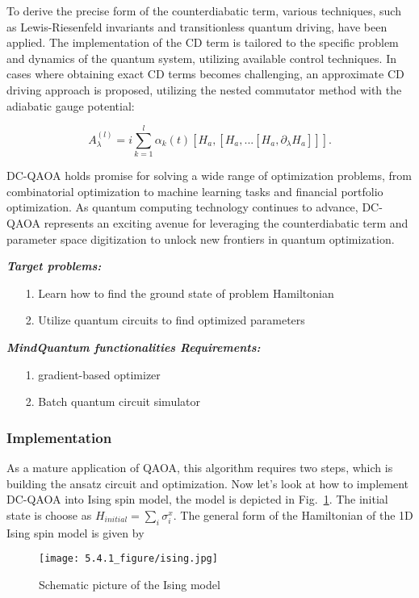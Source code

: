 To derive the precise form of the counterdiabatic term, various techniques, such as Lewis-Riesenfeld invariants and transitionless quantum driving, have been applied. The implementation of the CD term is tailored to the specific problem and dynamics of the quantum system, utilizing available control techniques. In cases where obtaining exact CD terms becomes challenging, an approximate CD driving approach is proposed, utilizing the nested commutator method\cite{Chandarana_2023} with the adiabatic gauge potential:

\begin{equation}
    A_{\lambda}^{(l)} = i\sum_{k=1}^{l}\alpha_{k}(t)[H_{a},[H_{a},...[H_{a}, \partial_{\lambda}H_{a}]]].
\end{equation}

DC-QAOA holds promise for solving a wide range of optimization problems, from combinatorial optimization to machine learning tasks and financial portfolio optimization. As quantum computing technology continues to advance, DC-QAOA represents an exciting avenue for leveraging the counterdiabatic term and parameter space digitization to unlock new frontiers in quantum optimization.

\textbf{\textit{Target problems:}}
\begin{itemize}
    \item[1.] Learn how to find the ground state of problem Hamiltonian
    \item[2.] Utilize quantum circuits to find optimized parameters
\end{itemize}
\textbf{\textit{MindQuantum functionalities Requirements:}}
\begin{itemize}
    \item[1.] gradient-based optimizer
    \item[2.] Batch quantum circuit simulator

\end{itemize}

\subsubsection{Implementation}
As a mature application of QAOA, this algorithm requires two steps, which is building the ansatz circuit and optimization. Now let's look at how to implement DC-QAOA into Ising spin model, the model is depicted in Fig.~\ref{fig:ising}. The initial state is choose as $H_{initial} = \sum_{i}\sigma_{i}^{x}$. The general form of the Hamiltonian of the 1D Ising spin model is given by
\begin{figure}
    \centering
    \texttt{[image: 5.4.1\_figure/ising.jpg]}
    \caption{Schematic picture of the Ising model}
    \label{fig:ising}
\end{figure}

